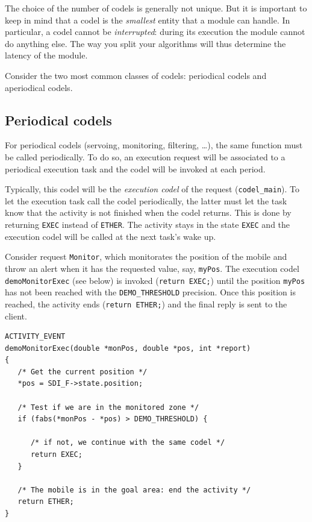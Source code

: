 The choice  of the number of  codels is generally  not unique.  But it is
important to keep in mind that a codel  is the \emph{smallest} entity that
a module can handle. In particular, a  codel cannot be \emph{interrupted}:
during  its execution the   module cannot do   anything else. The way you
split your algorithms will thus determine the latency of the module.

Consider  the two most  common classes of   codels: periodical codels and
aperiodical codels.

\subsection{Periodical codels}

For periodical codels (servoing, monitoring, filtering, \ldots), the same
function must be called periodically. To do so, an execution request will
be associated  to  a periodical  execution task  and  the  codel will  be
invoked at each period.

Typically, this codel  will be the \emph{execution codel} of the  request
(\texttt{codel\_main}).  To let   the    execution task call   the  codel
periodically, the latter must let the task know that  the activity is not
finished  when the codel  returns.  This is done  by returning \texttt{EXEC}
instead  of \texttt{ETHER}.  The activity stays  in the state \texttt{EXEC} and
the execution codel will be called at the next task's wake up.

Consider request \texttt{Monitor},   which monitorates the position   of the
mobile and  throw an  alert when it   has the requested value, say,  
\texttt{myPos}.  The  execution codel  \texttt{demoMonitorExec} (see below)  is invoked
(\texttt{return EXEC;}) until the position \texttt{myPos}  has not been reached
with the \texttt{DEMO\_THRESHOLD} precision. Once  this position is reached,
the activity ends (\texttt{return  ETHER;}) and the  final reply is sent  to
the client.

\begin{center}\begin{cartouche}\small\begin{verbatim}
ACTIVITY_EVENT
demoMonitorExec(double *monPos, double *pos, int *report)
{
   /* Get the current position */
   *pos = SDI_F->state.position;

   /* Test if we are in the monitored zone */
   if (fabs(*monPos - *pos) > DEMO_THRESHOLD) {

      /* if not, we continue with the same codel */
      return EXEC;
   }

   /* The mobile is in the goal area: end the activity */
   return ETHER;
}
\end{verbatim}\end{cartouche}\end{center}

